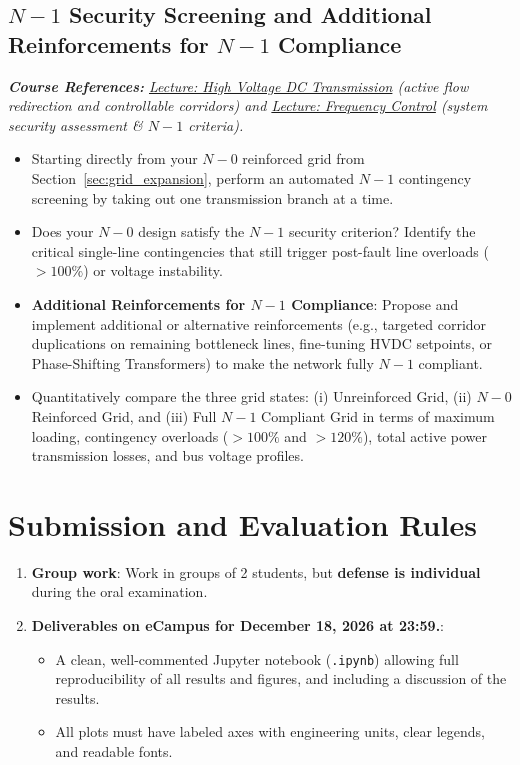 \documentclass[11pt]{article}
\begin{document}
  \subsection{$N-1$ Security Screening and Additional Reinforcements for $N-1$ Compliance}
  \noindent\textit{\textbf{Course References:} \href{https://github.com/bcornelusse/ELEC0447-analysis-power-systems/blob/master/Lectures/HVDC/main.pdf}{Lecture: High Voltage DC Transmission} (active flow redirection and controllable corridors) and \href{https://github.com/bcornelusse/ELEC0447-analysis-power-systems/blob/master/Lectures/frequency_control/main.pdf}{Lecture: Frequency Control} (system security assessment \& $N-1$ criteria).}
  \vspace{1mm}
  \begin{itemize}
    \item Starting directly from your $N-0$ reinforced grid from Section~\ref{sec:grid_expansion}, perform an automated $N-1$ contingency screening by taking out one transmission branch at a time.
    \item Does your $N-0$ design satisfy the $N-1$ security criterion? Identify the critical single-line contingencies that still trigger post-fault line overloads ($>100\%$) or voltage instability.
    \item \textbf{Additional Reinforcements for $N-1$ Compliance}: Propose and implement additional or alternative reinforcements (e.g., targeted corridor duplications on remaining bottleneck lines, fine-tuning HVDC setpoints, or Phase-Shifting Transformers) to make the network fully $N-1$ compliant.
    \item Quantitatively compare the three grid states: (i) Unreinforced Grid, (ii) $N-0$ Reinforced Grid, and (iii) Full $N-1$ Compliant Grid in terms of maximum loading, contingency overloads ($>100\%$ and $>120\%$), total active power transmission losses, and bus voltage profiles.
  \end{itemize}

\section{Submission and Evaluation Rules}
\begin{enumerate}
  \item \textbf{Group work}: Work in groups of 2 students, but \textbf{defense is individual} during the oral examination.
  \item \textbf{Deliverables on eCampus for December 18, 2026 at 23:59.}:
  \begin{itemize}
    \item A clean, well-commented Jupyter notebook (\lstinline|.ipynb|) allowing full reproducibility of all results and figures, and including a discussion of the results.
    \item All plots must have labeled axes with engineering units, clear legends, and readable fonts.
  \end{itemize}
\end{enumerate}
\end{document}
